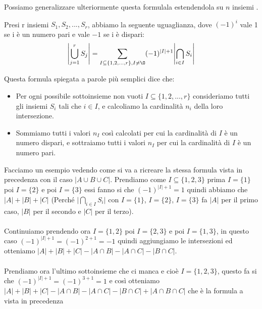 \hspace{-15pt}Possiamo generalizzare ulteriormente questa formulala estendendola su $n$ insiemi .
\begin{definition}
    Presi r insiemi $S_1, S_2,..., S_r$, abbiamo la seguente uguaglianza, dove $(-1)^i$ vale 1 se i è un numero pari e vale $-1$ se i è dispari:
    \begin{equation}
        \Biggl\lvert \bigcup\limits_{j=1}^r S_j \Biggr\rvert = \sum\limits_{I \subseteq \{1,2,...,r\}, I\neq \O }(-1)^{|I|+1} \Biggl\lvert\bigcap\limits_{i\in I}S_i\Biggr\rvert
    \end{equation}
\end{definition}
\hspace{-15pt}Questa formula spiegata a parole più semplici dice che:
\begin{itemize}
    \item Per ogni possibile sottoinsieme non vuoti $I \subseteq \{1,2,...,r\}$ consideriamo tutti gli insiemi $S_i$ tali che $i \in I$, e calcoliamo la cardinalità $n_i$ della loro intersezione.
    \item Sommiamo tutti i valori $n_I$ così calcolati per cui la cardinalità di $I$ è un numero dispari, e sottraiamo tutti i valori $n_I$ per cui la cardinalità di $I$ è un numero pari.
\end{itemize}
\begin{example}
Facciamo un esempio vedendo come si va a ricreare la stessa formula vista in precedenza con il caso $|A \cup B \cup C|$.
Prendiamo come $I \subseteq \{1,2,3\}$ prima $I = \{1\}$ poi $I = \{2\}$ e poi $I = \{3\}$ essi fanno si che $(-1)^{|I|+1} = 1$ quindi abbiamo che $|A| + |B| + |C|$ (Perché $\Biggl\lvert\bigcap\limits_{i\in I}S_i\Biggr\rvert$ con $I = \{1\}$, $I = \{2\}$, $I = \{3\}$ fa $|A|$ per il primo caso, $|B|$ per il secondo e $|C|$ per il terzo). \\\\
Continuiamo prendendo ora $I = \{1,2\}$ poi $I = \{2,3\}$ e poi $I = \{1,3\}$, in questo caso $(-1)^{|I|+1} = (-1)^{2+1} = -1$ quindi aggiungiamo le intersezioni ed otteniamo $|A| + |B| + |C| - |A \cap B| - |A \cap C| - |B \cap C|$. \\\\
Prendiamo ora l'ultimo sottoinsieme che ci manca e cioè $I = \{1,2,3\}$, questo fa si che $(-1)^{|I|+1} = (-1)^{3+1} = 1$ e così otteniamo $|A| + |B| + |C| - |A \cap B| - |A \cap C| - |B \cap C| + |A \cap B \cap C|$ che è la formula a vista in precedenza
\end{example}


